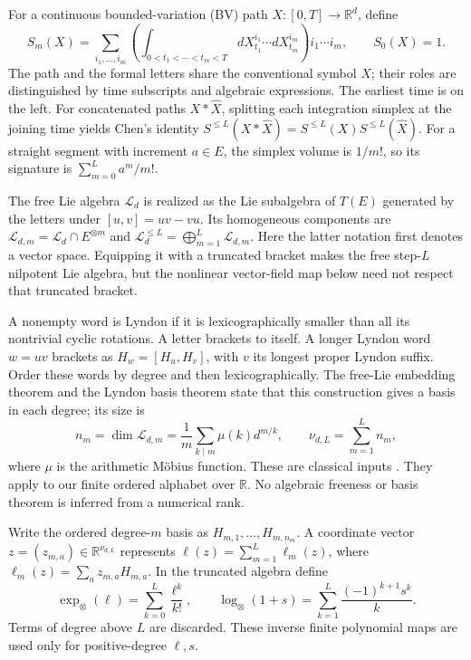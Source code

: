 \documentclass[11pt,a4paper]{article}
\numberwithin{equation}{section}
\theoremstyle{definition}
\theoremstyle{remark}
\newcommand{\R}{\mathbb R}
\newcommand{\Lie}{\mathcal L}
\begin{document}
For a continuous bounded-variation (BV) path $X:[0,T]\to\R^d$, define
\begin{equation}\label{eq:signature}
 S_m(X)=\sum_{i_1,\ldots,i_m}
 \left(\int_{0<t_1<\cdots<t_m<T}
 dX_{t_1}^{i_1}\cdots dX_{t_m}^{i_m}\right)i_1\cdots i_m,
 \qquad S_0(X)=1.
\end{equation}
The path and the formal letters share the conventional symbol $X$; their
roles are distinguished by time subscripts and algebraic expressions.
The earliest time is on the left. For concatenated paths $X*\widehat X$,
splitting each integration simplex at the joining time yields Chen's
identity $S^{\leq L}(X*\widehat X)=S^{\leq L}(X)S^{\leq L}(\widehat X)$.
For a straight segment with increment $a\in E$, the simplex volume is
$1/m!$, so its signature is $\sum_{m=0}^L a^m/m!$.

The free Lie algebra $\Lie_d$ is realized as the Lie subalgebra of $T(E)$
generated by the letters under $[u,v]=uv-vu$. Its homogeneous components are
$\Lie_{d,m}=\Lie_d\cap E^{\otimes m}$ and
$\Lie_d^{\leq L}=\bigoplus_{m=1}^L\Lie_{d,m}$. Here the latter notation
first denotes a vector space. Equipping it with a truncated bracket makes
the free step-$L$ nilpotent Lie algebra, but the nonlinear vector-field map
below need not respect that truncated bracket.

A nonempty word is Lyndon if it is lexicographically smaller than all its
nontrivial cyclic rotations. A letter brackets to itself. A longer Lyndon
word $w=uv$ brackets as $H_w=[H_u,H_v]$, with $v$ its longest proper Lyndon
suffix. Order these words by degree and then lexicographically. The
free-Lie embedding theorem and the Lyndon basis theorem state that this
construction gives a basis in each degree; its size is
\begin{equation}\label{eq:witt}
 n_m=\dim\Lie_{d,m}=\frac1m\sum_{k\mid m}\mu(k)d^{m/k},
 \qquad \nu_{d,L}=\sum_{m=1}^L n_m,
\end{equation}
where $\mu$ is the arithmetic M\"obius function. These are classical inputs
\cite[Theorems 0.4--0.5, 4.9, Corollary 4.14, Theorem 5.1]{Reutenauer}.
They apply to our finite ordered alphabet over $\R$. No algebraic freeness
or basis theorem is inferred from a numerical rank.

Write the ordered degree-$m$ basis as $H_{m,1},\ldots,H_{m,n_m}$. A coordinate
vector $z=(z_{m,a})\in\R^{\nu_{d,L}}$ represents
$\ell(z)=\sum_{m=1}^L\ell_m(z)$, where
$\ell_m(z)=\sum_a z_{m,a}H_{m,a}$. In the truncated algebra define
\[
 \exp_\otimes(\ell)=\sum_{k=0}^L\frac{\ell^k}{k!},\qquad
 \log_\otimes(1+s)=\sum_{k=1}^L\frac{(-1)^{k+1}s^k}{k}.
\]
Terms of degree above $L$ are discarded. These inverse finite polynomial
maps are used only for positive-degree $\ell,s$.
\end{document}
